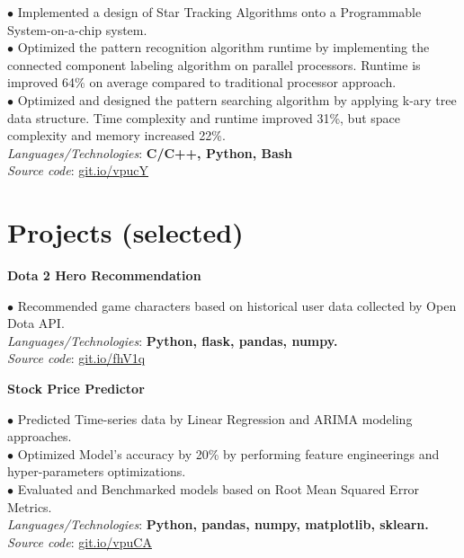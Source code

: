 \documentclass[10pt]{article}
\begin{document}
        \vspace{-5mm}

        $\bullet$ {Implemented a design of Star Tracking Algorithms onto a Programmable System-on-a-chip system. }\\
        $\bullet$ {Optimized the pattern recognition algorithm runtime by implementing the connected component labeling algorithm on parallel processors. Runtime is improved 64\% on average compared to traditional processor approach.} \\
        $\bullet$ {Optimized and designed the pattern searching algorithm by applying k-ary tree data structure. Time complexity and runtime improved 31\%, but space complexity and memory increased 22\%.} \\
        \emph{Languages/Technologies}: \textbf{C/C++, Python, Bash}\\
        \emph{Source code}: \href{https://git.io/vpucY}{git.io/vpucY}


    \section{Projects (selected)}
        \vspace{-2mm}

        \begin{center}
            \textbf{Dota 2 Hero Recommendation}
        \end{center}
        $\bullet$ {Recommended game characters based on historical user data collected by Open Dota API.} \\
        \emph{Languages/Technologies}: \textbf{Python, flask, pandas, numpy.} \\
        \emph{Source code}: \href{https://git.io/fhV1q}{git.io/fhV1q}


        \begin{center}
            \textbf{Stock Price Predictor}
        \end{center}
        $\bullet$ {Predicted Time-series data by Linear Regression and ARIMA modeling approaches.} \\
        $\bullet$ {Optimized Model's accuracy by 20\% by performing feature engineerings and hyper-parameters optimizations.} \\
        $\bullet$ {Evaluated and Benchmarked models based on Root Mean Squared Error Metrics.} \\
        \emph{Languages/Technologies}: \textbf{Python, pandas, numpy, matplotlib, sklearn.} \\
        \emph{Source code}: \href{https://git.io/vpuCA}{git.io/vpuCA}
\end{document}
